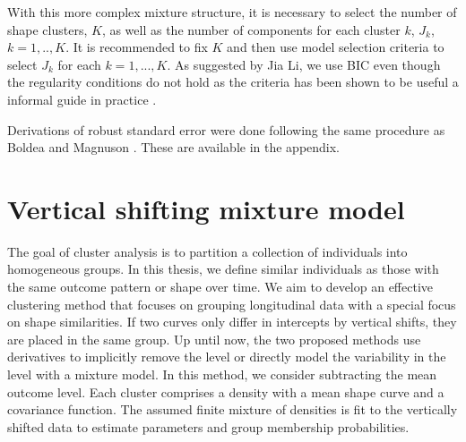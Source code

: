 With this more complex mixture structure, it is necessary to select the number of shape clusters, $K$, as well as the number of components for each cluster $k$, $J_{k}$, $k=1,..,K$. It is recommended to fix $K$ and then use model selection criteria to select $J_{k}$ for each $k=1,...,K$. As suggested by Jia Li, we use BIC even though the regularity conditions do not hold as the criteria has been shown to be useful a informal guide in practice \cite{li2005}.

Derivations of robust standard error  were done following the same procedure as Boldea and Magnuson \cite{boldea2009}. These are available in the appendix.

\section{Vertical shifting mixture model}
The goal of cluster analysis is to partition a collection of individuals into homogeneous groups. In this thesis, we define similar individuals as those with the same outcome pattern or shape over time. We aim to develop an effective clustering method that focuses on grouping longitudinal data with a special focus on shape similarities. If two curves only differ in intercepts by vertical shifts, they are placed in the same group. Up until now, the two proposed methods use derivatives to implicitly remove the level or directly model the variability in the level with a mixture model.  In this method, we consider subtracting the mean outcome level. Each cluster comprises a density with a mean shape curve and a covariance function. The assumed finite mixture of densities is fit to the vertically shifted data to estimate parameters and group membership probabilities. 

